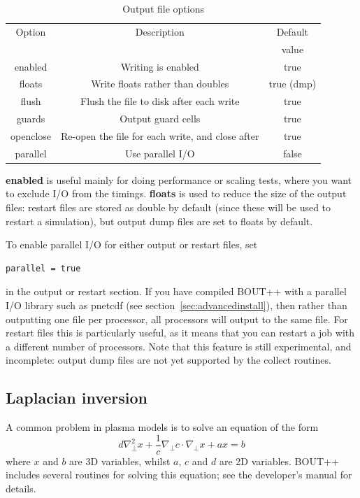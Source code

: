 \documentclass[12pt]{article}
\begin{document}
\begin{table}[htb!]
\centering
\caption{Output file options}
\label{tab:outputopts}
\begin{tabular}{c | c | c}
\hline
Option & Description & Default\\
       &             & value\\
\hline
enabled & Writing is enabled & true \\
floats & Write floats rather than doubles & true (dmp)\\
flush & Flush the file to disk after each write & true \\
guards & Output guard cells & true \\
openclose & Re-open the file for each write, and close after & true \\
parallel & Use parallel I/O & false \\
\hline
\end{tabular}
\end{table}

{\bf enabled} is useful mainly for doing performance or scaling tests, where you want to exclude
I/O from the timings. {\bf floats} is used to reduce the size of the output files: restart files are
stored as double by default (since these will be used to restart a simulation), but output dump files
are set to floats by default.

To enable parallel I/O for either output or restart files, set 
\begin{lstlisting}
parallel = true
\end{lstlisting}
in the output or restart section. If you have compiled BOUT++ with a parallel I/O library
such as pnetcdf (see section~\ref{sec:advancedinstall}), then rather than outputting one file per processor, all 
processors will output to the same file. For restart files this is particularly useful,
as it means that you can restart a job with a different number of processors. 
Note that this feature is still experimental, and incomplete: output dump files are
not yet supported by the collect routines.

\subsection{Laplacian inversion}
A common problem in plasma models is to solve an equation of the form
\[
d\nabla^2_\perp x + \frac{1}{c}\nabla_\perp c\cdot\nabla_\perp x + a x = b
\]
where $x$ and $b$ are 3D variables, whilst $a$, $c$ and $d$ are 2D variables.
BOUT++ includes several routines for solving this equation; see the
developer's manual for details.
\end{document}
